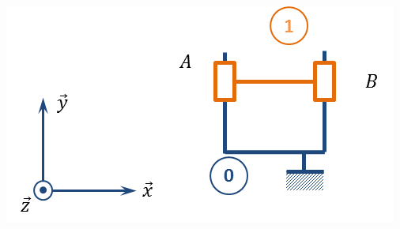 \documentclass[10pt]{article}
\begin{document}
\begin{minipage}[c]{.32\linewidth}
\begin{center}
\includegraphics[width=.95\textwidth]{images/fig_10}
\end{center}
\end{minipage}
\end{document}
